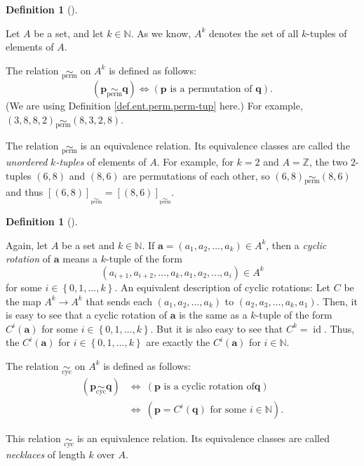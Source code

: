 \documentclass[numbers=enddot,12pt,final,onecolumn,notitlepage]{scrartcl}%
\numberwithin{exer}{subsection}
\theoremstyle{definition}
\newtheorem{defi}[theo]{Definition}
\newenvironment{definition}[1][]
{\begin{defi}[#1]\begin{leftbar}}
{\end{leftbar}\end{defi}}
\begin{document}
\begin{definition}
Let $A$ be a set, and let $k\in\mathbb{N}$. As we know, $A^{k}$ denotes the
set of all $k$-tuples of elements of $A$.

The relation $\underset{\operatorname*{perm}}{\sim}$ on $A^{k}$ is defined as
follows:%
\[
\left(  \mathbf{p}\underset{\operatorname*{perm}}{\sim}\mathbf{q}\right)
\Longleftrightarrow\left(  \mathbf{p}\text{ is a permutation of }%
\mathbf{q}\right)  .
\]
(We are using Definition \ref{def.ent.perm.perm-tup} here.) For example,
$\left(  3,8,8,2\right)  \underset{\operatorname*{perm}}{\sim}\left(
8,3,2,8\right)  $.

The relation $\underset{\operatorname*{perm}}{\sim}$ is an equivalence
relation. Its equivalence classes are called the \textit{unordered }%
$k$\textit{-tuples} of elements of $A$. For example, for $k=2$ and
$A=\mathbb{Z}$, the two $2$-tuples $\left(  6,8\right)  $ and $\left(
8,6\right)  $ are permutations of each other, so $\left(  6,8\right)
\underset{\operatorname*{perm}}{\sim}\left(  8,6\right)  $ and thus $\left[
\left(  6,8\right)  \right]  _{\underset{\operatorname*{perm}}{\sim}}=\left[
\left(  8,6\right)  \right]  _{\underset{\operatorname*{perm}}{\sim}}$.
\end{definition}

\begin{definition}
Again, let $A$ be a set and $k\in\mathbb{N}$. If $\mathbf{a}=\left(
a_{1},a_{2},\ldots,a_{k}\right)  \in A^{k}$, then a \textit{cyclic rotation}
of $\mathbf{a}$ means a $k$-tuple of the form%
\[
\left(  a_{i+1},a_{i+2},\ldots,a_{k},a_{1},a_{2},\ldots,a_{i}\right)  \in
A^{k}%
\]
for some $i\in\left\{  0,1,\ldots,k\right\}  $. An equivalent description of
cyclic rotations: Let $C$ be the map $A^{k}\rightarrow A^{k}$ that sends each
$\left(  a_{1},a_{2},\ldots,a_{k}\right)  $ to $\left(  a_{2},a_{3}%
,\ldots,a_{k},a_{1}\right)  $. Then, it is easy to see that a cyclic rotation
of $\mathbf{a}$ is the same as a $k$-tuple of the form $C^{i}\left(
\mathbf{a}\right)  $ for some $i\in\left\{  0,1,\ldots,k\right\}  $. But it is
also easy to see that $C^{k}=\operatorname*{id}$. Thus, the $C^{i}\left(
\mathbf{a}\right)  $ for $i\in\left\{  0,1,\ldots,k\right\}  $ are exactly the
$C^{i}\left(  \mathbf{a}\right)  $ for $i\in\mathbb{N}$.

The relation $\underset{\operatorname*{cyc}}{\sim}$ on $A^{k}$ is defined as
follows:%
\begin{align*}
\left(  \mathbf{p}\underset{\operatorname*{cyc}}{\sim}\mathbf{q}\right)   &
\Longleftrightarrow\ \left(  \mathbf{p}\text{ is a cyclic rotation of
}\mathbf{q}\right) \\
&  \Longleftrightarrow\ \left(  \mathbf{p}=C^{i}\left(  \mathbf{q}\right)
\text{ for some }i\in\mathbb{N}\right)  .
\end{align*}


This relation $\underset{\operatorname*{cyc}}{\sim}$ is an equivalence
relation. Its equivalence classes are called \textit{necklaces} of length $k$
over $A$.
\end{definition}
\end{document}

